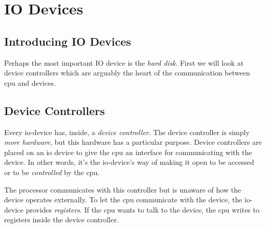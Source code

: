 

\chapter{IO Devices}


\section{Introducing IO Devices}


Perhaps the most important IO device is the \textit{hard disk}. 
First we will look at device controllers which are arguably the heart of the
communication between cpu and devices. 

\section{Device Controllers}

Every io-device has, inside, a \textit{device controller}.  
The device controller is simply \textit{more hardware}, 
but this hardware has a particular purpose. 
Device controllers are placed on an io device to give the cpu an interface for communicating
with the device. In other words, it's the io-device's way of making it open to be 
accessed or to be \textit{controlled} by the cpu.

\begin{figure}[h]
\end{figure} 

The processor communicates with this controller but is unaware of how the device 
operates externally. To let the cpu communicate with the device, the io-device provides 
\textit{registers}. If the cpu wants to talk to the device, the cpu writes 
to registers inside the device controller. 

\begin{figure}[h]
\end{figure} 

